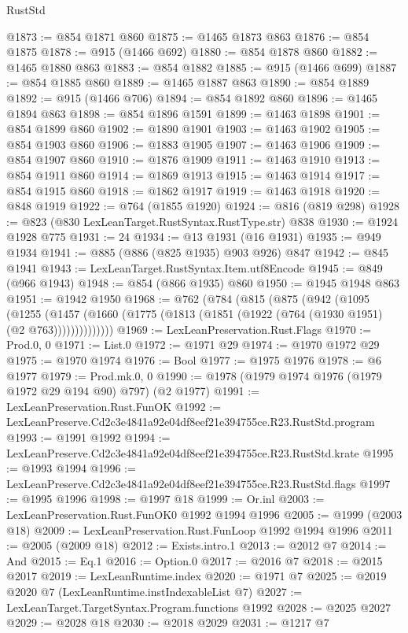 \begin{lexlean}{RustStd}
\begin{coremodule}
@1873 := @854 @1871 @860
@1875 := @1465 @1873 @863
@1876 := @854 @1875
@1878 := @915 (@1466 @692)
@1880 := @854 @1878 @860
@1882 := @1465 @1880 @863
@1883 := @854 @1882
@1885 := @915 (@1466 @699)
@1887 := @854 @1885 @860
@1889 := @1465 @1887 @863
@1890 := @854 @1889
@1892 := @915 (@1466 @706)
@1894 := @854 @1892 @860
@1896 := @1465 @1894 @863
@1898 := @854 @1896 @1591
@1899 := @1463 @1898
@1901 := @854 @1899 @860
@1902 := @1890 @1901
@1903 := @1463 @1902
@1905 := @854 @1903 @860
@1906 := @1883 @1905
@1907 := @1463 @1906
@1909 := @854 @1907 @860
@1910 := @1876 @1909
@1911 := @1463 @1910
@1913 := @854 @1911 @860
@1914 := @1869 @1913
@1915 := @1463 @1914
@1917 := @854 @1915 @860
@1918 := @1862 @1917
@1919 := @1463 @1918
@1920 := @848 @1919
@1922 := @764 (@1855 @1920)
@1924 := @816 (@819 @298)
@1928 := @823 (@830 LexLeanTarget.RustSyntax.RustType.str) @838
@1930 := @1924 @1928 @775
@1931 := 24
@1934 := @13 @1931 (@16 @1931)
@1935 := @949 @1934
@1941 := @885 (@886 (@825 @1935) @903 @926) @847
@1942 := @845 @1941
@1943 := LexLeanTarget.RustSyntax.Item.utf8Encode
@1945 := @849 (@966 @1943)
@1948 := @854 (@866 @1935) @860
@1950 := @1945 @1948 @863
@1951 := @1942 @1950
@1968 := @762
    (@784
      (@815
        (@875
          (@942
            (@1095
              (@1255
                (@1457 (@1660 (@1775 (@1813 (@1851 (@1922 (@764 (@1930 @1951) (@2 @763))))))))))))))
@1969 := LexLeanPreservation.Rust.Flags
@1970 := Prod.{0, 0}
@1971 := List.{0}
@1972 := @1971 @29
@1974 := @1970 @1972 @29
@1975 := @1970 @1974
@1976 := Bool
@1977 := @1975 @1976
@1978 := @6 @1977
@1979 := Prod.mk.{0, 0}
@1990 := @1978 (@1979 @1974 @1976 (@1979 @1972 @29 @194 @90) @797) (@2 @1977)
@1991 := LexLeanPreservation.Rust.FunOK
@1992 := LexLeanPreserve.Cd2c3e4841a92e04df8eef21e394755ce.R23.RustStd.program
@1993 := @1991 @1992
@1994 := LexLeanPreserve.Cd2c3e4841a92e04df8eef21e394755ce.R23.RustStd.krate
@1995 := @1993 @1994
@1996 := LexLeanPreserve.Cd2c3e4841a92e04df8eef21e394755ce.R23.RustStd.flags
@1997 := @1995 @1996
@1998 := @1997 @18
@1999 := Or.inl
@2003 := LexLeanPreservation.Rust.FunOK0 @1992 @1994 @1996
@2005 := @1999 (@2003 @18)
@2009 := LexLeanPreservation.Rust.FunLoop @1992 @1994 @1996
@2011 := @2005 (@2009 @18)
@2012 := Exists.intro.{1}
@2013 := @2012 @7
@2014 := And
@2015 := Eq.{1}
@2016 := Option.{0}
@2017 := @2016 @7
@2018 := @2015 @2017
@2019 := LexLeanRuntime.index
@2020 := @1971 @7
@2025 := @2019 @2020 @7 (LexLeanRuntime.instIndexableList @7)
@2027 := LexLeanTarget.TargetSyntax.Program.functions @1992
@2028 := @2025 @2027
@2029 := @2028 @18
@2030 := @2018 @2029
@2031 := @1217 @7

\end{coremodule}
\end{lexlean}
